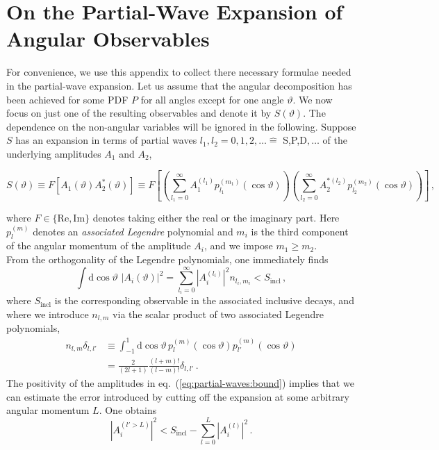 \documentclass[aps,nofootinbib,preprintnumbers,prd,twocolumn]{revtex4-1}
\newcommand{\refeq}[1]{eq.~(\ref{eq:#1})}
\newcommand{\rmdx}[1]{\mbox{d} #1 \,} %
\renewcommand{\theta}{\vartheta}
\newcommand{\add}[1]{\textcolor{green!85!black}{#1}}
\begin{document}
\section{On the Partial-Wave Expansion of Angular Observables}
\label{app:partial-waves}

\add{For convenience, we use this appendix to collect there necessary
formulae needed in the partial-wave expansion.}
Let us assume that the angular decomposition has been achieved for
some PDF $P$ for all angles except for one angle $\theta$. We now
focus on just one of the resulting observables and denote it by
$S(\theta)$. The dependence on the non-angular variables will be
ignored in the following. Suppose $S$
has an expansion in terms of partial waves $l_1, l_2 = 0,1,2,\dots
\hat{=}$ S,P,D$,\dots$ of the underlying amplitudes $A_1$ and $A_2$,
\begin{widetext}
\begin{equation}
    \label{eq:def-partial-wave-observable}
    S(\theta) \equiv F\left[A_1(\theta) A_2^*(\theta)\right] \equiv F\left[\left(\sum_{l_1=0}^\infty A_1^{(l_1)} p_{l_1}^{(m_1)}(\cos\theta)\right) \left(\sum_{l_2=0}^\infty A_2^{*(l_2)} p_{l_2}^{(m_2)}(\cos\theta)\right)\right]\,,
\end{equation}
\end{widetext}
where $F \in \{\text{Re},\text{Im}\}$ denotes taking either the real
or the imaginary part. Here $p_{l}^{(m)}$ denotes an \emph{associated Legendre} polynomial and $m_i$ is the third component of the angular momentum of the amplitude $A_i$, and we impose $m_1 \geq m_2$.\\

From the orthogonality of the Legendre polynomials, one immediately finds
\begin{equation}
    \label{eq:partial-waves:bound}
    \int \rmdx{\cos\theta}  \, |A_i(\theta)|^2 = \sum_{l_i = 0}^\infty |A_i^{(l_i)}|^2 n_{l_i, m_i} < S_\text{incl}\,,
\end{equation}
where $S_\text{incl}$ is the corresponding observable in the associated inclusive decays,
and where we introduce $n_{l,m}$ via the scalar product of two associated Legendre polynomials,
\begin{equation}
\label{eq:legendre-scalar-product}
\begin{aligned}
    n_{l, m} \delta_{l, l'}
    & \equiv \int_{-1}^1 \rmdx{\cos\theta} p_{l}^{(m)}(\cos\theta) p_{l'}^{(m)} (\cos\theta)\\
    & = \frac{2}{(2 l + 1)} \frac{(l + m)!}{(l - m)!} \delta_{l, l'}\,.
\end{aligned}
\end{equation}
The positivity of the amplitudes in \refeq{partial-waves:bound} implies that we can estimate
the error introduced by cutting off the expansion at some arbitrary angular momentum $L$. One
obtains
\begin{equation}
    |A_i^{(l' > L)}|^2 < S_\text{incl} - \sum_{l=0}^L |A_i^{(l)}|^2\,.
\end{equation}
\end{document}
